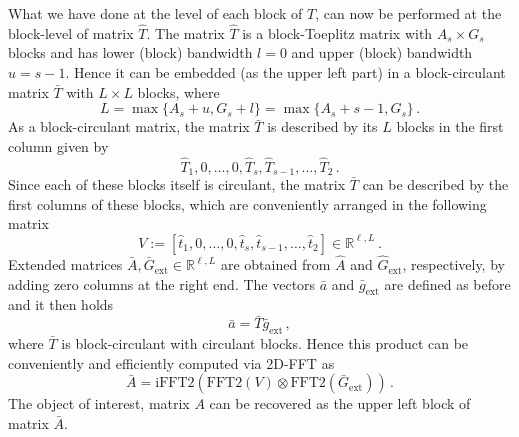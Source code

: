 \documentclass[a4,12pt]{article}
\newcommand{\Real}[1]{\mathbb{R}^{#1}}
\begin{document}
What we have done at the level of each block of $T$, can now be performed at
the block-level of matrix $\hat{T}$. The matrix $\hat{T}$ is a
block-Toeplitz matrix with $A_s\times G_s$ blocks and has lower (block)
bandwidth $l=0$ and upper (block) bandwidth $u=s-1$.
Hence it can be embedded (as the upper left part) in a block-circulant matrix 
$\bar{T}$ with $L\times L$ blocks, where
\[
L=\max\{A_s+u,G_s+l\}= \max\{A_s+s-1,G_s\}\,.
\]
As a block-circulant matrix, the matrix $\bar{T}$ is described by its $L$ blocks in
the first column given by
\[
\hat{T}_1, 0, \dots, 0, \hat{T}_s, \hat{T}_{s-1}, \dots, \hat{T}_2\,.
\]
Since each of these blocks itself is circulant, the matrix $\bar{T}$ can be
described by the first columns of these blocks, which are conveniently arranged
in the following matrix
\[
V:=
[\hat{t}_1, 0, \dots, 0, \hat{t}_s, \hat{t}_{s-1}, \dots,
\hat{t}_2]\in\Real{\ell,L}\,. 
\] 
Extended matrices $\bar{A}, \bar{G}_\text{ext}\in\Real{\ell,L}$ are obtained from
$\hat{A}$ and $\hat{G}_\text{ext}$, respectively, by adding zero columns at the
right end. The vectors $\bar{a}$ and $\bar{g}_\text{ext}$ are defined as before
and it then holds
\[
\bar{a} = \bar{T}\bar{g}_\text{ext}\,,
\]
where $\bar{T}$ is block-circulant with circulant blocks. Hence this product can
be conveniently and efficiently computed via 2D-FFT as
\[
\bar{A} = \text{iFFT2}(\text{FFT2}(V) \otimes \text{FFT2}(\bar{G}_\text{ext}))\,.
\]
The object of interest, matrix $A$ can be recovered as the upper left block of
matrix $\bar{A}$.
\end{document}
